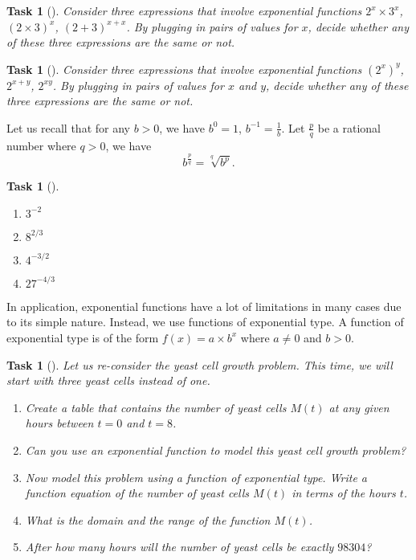 \documentclass[10pt,]{article}
\theoremstyle{plain}
\newtheorem{proposition}[theorem]{Task}
\theoremstyle{definition}
\numberwithin{equation}{section}
\newcommand{\gt}{>}
\begin{document}
\begin{proposition}[{}]\label{proposition-14}
\hypertarget{p-67}{}%
Consider three expressions that involve exponential functions \(2^x \times 3^x\), \((2 \times 3)^{x}\), \((2 + 3)^{x+x}\). By plugging in pairs of values for \(x\), decide whether any of these three expressions are the same or not.%
\end{proposition}
\begin{proposition}[{}]\label{proposition-15}
\hypertarget{p-68}{}%
Consider three expressions that involve exponential functions \((2^x)^y\), \(2^{x+y}\), \(2^{xy}\). By plugging in pairs of values for \(x\) and \(y\), decide whether any of these three expressions are the same or not.%
\end{proposition}
\hypertarget{p-69}{}%
Let us recall that for any \(b \gt 0\), we have \(b^0=1\), \(b^{-1} = \frac{1}{b}\). Let \(\frac{p}{q}\) be a rational number where \(q \gt 0\), we have%
\begin{equation*}
b^{\frac{p}{q}} = \sqrt[q]{b^p}.
\end{equation*}
%
\begin{proposition}[{}]\label{proposition-16}
\leavevmode%
\begin{enumerate}
\item\hypertarget{li-110}{}\(3^{-2}\)%
\item\hypertarget{li-111}{}\(8^{2/3}\)%
\item\hypertarget{li-112}{}\(4^{-3/2}\)%
\item\hypertarget{li-113}{}\(27^{-4/3}\)%
\end{enumerate}
\end{proposition}
\hypertarget{p-70}{}%
In application, exponential functions have a lot of limitations in many cases due to its simple nature. Instead, we use functions of exponential type. A function of exponential type is of the form \(f(x) = a \times b^x\) where \(a \neq 0\) and \(b \gt 0 \).%
\begin{proposition}[{}]\label{proposition-17}
\hypertarget{p-71}{}%
Let us re-consider the yeast cell growth problem. This time, we will start with three yeast cells instead of one.%
\leavevmode%
\begin{enumerate}
\item\hypertarget{li-114}{}Create a table that contains the number of yeast cells \(M(t)\) at any given hours between \(t=0\) and \(t=8\).%
\item\hypertarget{li-115}{}Can you use an exponential function to model this yeast cell growth problem?%
\item\hypertarget{li-116}{}Now model this problem using a function of exponential type. Write a function equation of the number of yeast cells \(M(t)\) in terms of the hours \(t\).%
\item\hypertarget{li-117}{}What is the domain and the range of the function \(M(t)\).%
\item\hypertarget{li-118}{}After how many hours will the number of yeast cells be exactly \(98304\)?%
\end{enumerate}
\end{proposition}
\end{document}
